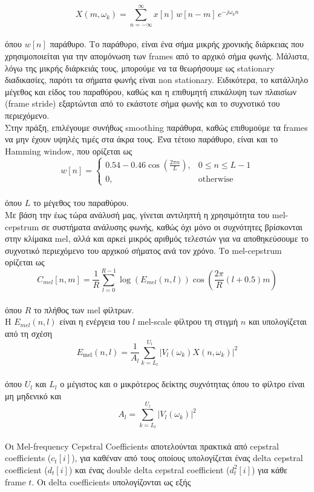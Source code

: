 \documentclass{article}
\begin{document}
\\[1.5mm]
\[X(m,\omega_k) = \sum_{n=-\infty}^{\infty} x[n]\, w[n - m] \, e^{-j\omega_k n}\]
\\[1.5mm]
όπου $w[n]$ παράθυρο. Το παράθυρο, είναι ένα σήμα μικρής χρονικής διάρκειας που χρησιμοποιείται για την απομόνωση των frames από το αρχικό σήμα φωνής. Μάλιστα, λόγω της μικρής διάρκειάς τους, μπορούμε να τα θεωρήσουμε ως stationary διαδικασίες, παρότι τα σήματα φωνής είναι non stationary. Ειδικότερα, το κατάλληλο μέγεθος και είδος του παραθύρου, καθώς και η επιθυμητή επικάλυψη των πλαισίων (frame stride) εξαρτώνται από το εκάστοτε σήμα φωνής και το συχνοτικό του περιεχόμενο.
\\[1.5mm]
Στην πράξη, επιλέγουμε συνήθως smoothing παράθυρα, καθώς επιθυμούμε τα frames να μην έχουν υψηλές τιμές στα άκρα τους. Ένα τέτοιο παράθυρο, είναι και το Hamming window, που ορίζεται ως
\\[1.5mm]
\[w[n] =
\begin{cases}
0.54 - 0.46 \cos\left(\frac{2\pi n}{L}\right), & 0 \le n \le L-1 \\
0, & \text{otherwise}
\end{cases}\]
\\[1.5mm]
όπου $L$ το μέγεθος του παραθύρου.
\\[1.5mm]
Με βάση την έως τώρα ανάλυσή μας, γίνεται αντιληπτή η χρησιμότητα του mel-cepstrum σε συστήματα ανάλυσης φωνής, καθώς όχι μόνο οι συχνότητες βρίσκονται στην κλίμακα mel, αλλά και αρκεί μικρός αριθμός τελεστών για να αποθηκεύσουμε το συχνοτικό περιεχόμενο του αρχικού σήματος ανά τον χρόνο. Το mel-cepstrum ορίζεται ως
\\[1.5mm]
\[C_{mel}[n,m] =\dfrac{1}{R} \sum_{l=0}^{R-1} \log\left(E_{mel}(n,l)\right)\cos\left(\frac{2\pi}{R}(l + 0.5)m\right)\]
\\[1.5mm]
όπου $R$ το πλήθος των mel φίλτρων.
\\[1.5mm]
Η $E_{mel}(n, l)$ είναι η ενέργεια του $l$ mel-scale φίλτρου τη στιγμή $n$ και υπολογίζεται από τη σχέση
\\[1.5mm]
\[E_{\mathrm{mel}}(n, l) = \dfrac{1}{A_l}\sum_{k=L_l}^{U_l} |V_l(\omega _k )X(n,\omega _k)|^2 \]
\\[1.5mm]
όπου $U_l$ και $L_l$ ο μέγιστος και ο μικρότερος δείκτης συχνότητας όπου το φίλτρο είναι μη μηδενικό και
\\[1.5mm]
\[A_l=\sum_{k=L_l}^{U_l} |V_l(\omega _k )|^2 \]
\\[1.5mm]
\label{delta}
Οι Mel-frequency Cepstral Coefficients αποτελούνται πρακτικά από cepstral coefficients ($c_t[i]$), για καθέναν από τους οποίους υπολογίζεται ένας delta cepstral coefficient ($d_t[i]$) και ένας double delta cepstral coefficient ($d_{t}^2[i]$) για κάθε frame $t$. Οι delta coefficients υπολογίζονται ως εξής
\end{document}
